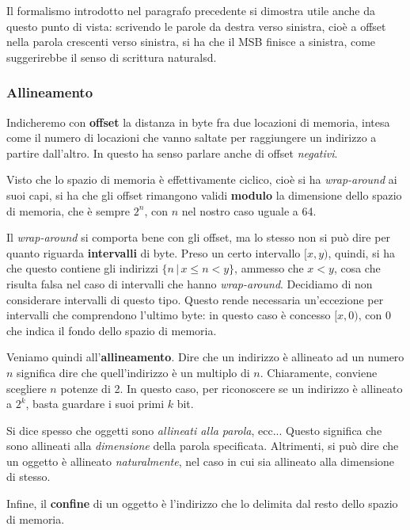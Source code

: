 \documentclass[a4paper,11pt]{article}
\begin{document}
Il formalismo introdotto nel paragrafo precedente si dimostra utile anche da questo punto di vista: scrivendo le parole da destra verso sinistra, cioè a offset nella parola crescenti verso sinistra, si ha che il MSB finisce a sinistra, come suggerirebbe il senso di scrittura naturalsd.

\subsubsection{Allineamento}
Indicheremo con \textbf{offset} la distanza in byte fra due locazioni di memoria, intesa come il numero di locazioni che vanno saltate per raggiungere un indirizzo a partire dall'altro.
In questo ha senso parlare anche di offset \textit{negativi}.

Visto che lo spazio di memoria è effettivamente ciclico, cioè si ha \textit{wrap-around} ai suoi capi, si ha che gli offset rimangono validi \textbf{modulo} la dimensione dello spazio di memoria, che è sempre $2^n$, con $n$ nel nostro caso uguale a 64.

Il \textit{wrap-around} si comporta bene con gli offset, ma lo stesso non si può dire per quanto riguarda \textbf{intervalli} di byte.
Preso un certo intervallo $[x, y)$, quindi, si ha che questo contiene gli indirizzi $\{n \, | \, x \leq n < y\}$, ammesso che $x < y$, cosa che risulta falsa nel caso di intervalli che hanno \textit{wrap-around}. 
Decidiamo di non considerare intervalli di questo tipo.
Questo rende necessaria un'eccezione per intervalli che comprendono l'ultimo byte: in questo caso è concesso $[x, 0)$, con 0 che indica il fondo dello spazio di memoria.

Veniamo quindi all'\textbf{allineamento}.
Dire che un indirizzo è allineato ad un numero $n$ significa dire che quell'indirizzo è un multiplo di $n$.
Chiaramente, conviene scegliere $n$ potenze di 2.
In questo caso, per riconoscere se un indirizzo è allineato a $2^k$, basta guardare i suoi primi $k$ bit.

Si dice spesso che oggetti sono \textit{allineati alla parola}, ecc...
Questo significa che sono allineati alla \textit{dimensione} della parola specificata.
Altrimenti, si può dire che un oggetto è allineato \textit{naturalmente}, nel caso in cui sia allineato alla dimensione di stesso.

Infine, il \textbf{confine} di un oggetto è l'indirizzo che lo delimita dal resto dello spazio di memoria.
\end{document}
